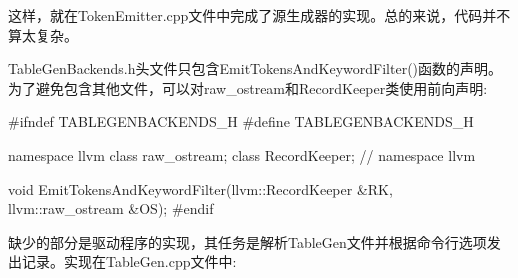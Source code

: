 这样，就在TokenEmitter.cpp文件中完成了源生成器的实现。总的来说，代码并不算太复杂。

TableGenBackends.h头文件只包含EmitTokensAndKeywordFilter()函数的声明。为了避免包含其他文件，可以对raw\_ostream和RecordKeeper类使用前向声明:

\begin{cpp}
#ifndef TABLEGENBACKENDS_H
#define TABLEGENBACKENDS_H

namespace llvm {
    class raw_ostream;
    class RecordKeeper;
} // namespace llvm

void EmitTokensAndKeywordFilter(llvm::RecordKeeper &RK,
                                llvm::raw_ostream &OS);
#endif
\end{cpp}

缺少的部分是驱动程序的实现，其任务是解析TableGen文件并根据命令行选项发出记录。实现在TableGen.cpp文件中:

